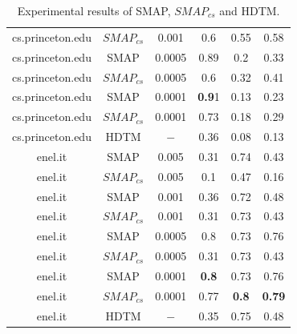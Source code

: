 \begin{table}[t]
\begin{tabular}{|c|c|c|c|c|c|}
cs.princeton.edu &  $SMAP_{cs}$ & 0.001  & 0.6&  0.55& 0.58 \\
cs.princeton.edu &  SMAP & 0.0005  & 0.89 & 0.2 & 0.33 \\
cs.princeton.edu &  $SMAP_{cs}$ & 0.0005  & 0.6 &0.32  &0.41  \\
cs.princeton.edu &  SMAP & 0.0001 & \textbf{0.9}1 & 0.13 & 0.23 \\
cs.princeton.edu &  $SMAP_{cs}$ & 0.0001  & 0.73 & 0.18 & 0.29  \\
cs.princeton.edu &  HDTM & $-$ & 0.36 & 0.08 & 0.13 \\
\hline
enel.it & SMAP & 0.005 & 0.31 & 0.74 & 0.43 \\
enel.it &  $SMAP_{cs}$ & 0.005  &0.1 & 0.47 & 0.16  \\
enel.it & SMAP & 0.001  & 0.36 & 0.72 & 0.48 \\
enel.it &  $SMAP_{cs}$ & 0.001  & 0.31& 0.73 & 0.43 \\
enel.it & SMAP & 0.0005  & 0.8 & 0.73 & 0.76 \\
enel.it &  $SMAP_{cs}$ & 0.0005  & 0.31 & 0.73  & 0.43  \\
enel.it & SMAP & 0.0001  & \textbf{0.8} & 0.73 & 0.76 \\
enel.it &  $SMAP_{cs}$ & 0.0001  & 0.77 & \textbf{0.8}  & \textbf{0.79}  \\
enel.it & HDTM & $-$ & 0.35 & 0.75 & 0.48 \\
\hline
\end{tabular}
\caption{Experimental results of SMAP, $SMAP_{cs}$ and HDTM.}
\label{tableResSitemap}
\end{table}
